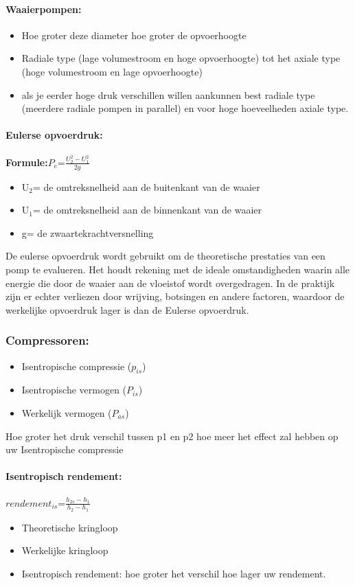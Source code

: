 \documentclass[12pt]{article}
\begin{document}
\paragraph{Waaierpompen:}
\begin{itemize}
    \item Hoe groter deze diameter hoe groter de opvoerhoogte
    \item Radiale type (lage volumestroom en hoge opvoerhoogte) tot het axiale type (hoge volumestroom en lage opvoerhoogte)
    \item als je eerder hoge druk verschillen willen aankunnen best radiale type (meerdere radiale pompen in parallel) en voor hoge hoeveelheden axiale type.
\end{itemize}
\paragraph{Eulerse opvoerdruk:}
\textbf{Formule:}$P_e$=$\frac{U_2^2-U_1^2}{2g}$\begin{itemize}
    \item U$_2$= de omtreksnelheid aan de buitenkant van de waaier 
    \item U$_1$= de omtreksnelheid aan de binnenkant van de waaier
    \item g= de zwaartekrachtversnelling
\end{itemize}
De eulerse opvoerdruk wordt gebruikt om de theoretische prestaties van een pomp te evalueren. Het houdt rekening met de ideale omstandigheden waarin alle energie die door de waaier aan de vloeistof wordt overgedragen. In de praktijk zijn er echter verliezen door wrijving, botsingen en andere factoren, waardoor de werkelijke opvoerdruk lager is dan de Eulerse opvoerdruk.
\subsubsection{Compressoren:}
\begin{itemize}
    \item Isentropische compressie ($p_{is}$)
    \item Isentropische vermogen ($P_{is}$)
    \item Werkelijk vermogen ($P_{as}$)
\end{itemize}
Hoe groter het druk verschil tussen p1 en p2 hoe meer het effect zal hebben op uw Isentropische compressie
\paragraph{Isentropisch rendement:}
$rendement_{is}$=$\frac{h_{2s}-h_1}{h_2-h_1}$
\begin{itemize}
    \item Theoretische kringloop
    \item Werkelijke kringloop
    \item Isentropisch rendement: hoe groter het verschil hoe lager uw rendement.
\end{itemize}
\end{document}

